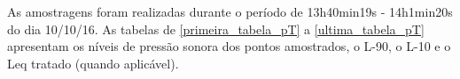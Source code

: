 
\begin{SingleSpace}
As amostragens foram realizadas durante o período de 13h40min19s - 14h1min20s do dia 10/10/16. As tabelas de \ref{primeira_tabela_pT} a \ref{ultima_tabela_pT} apresentam os níveis de pressão sonora dos pontos amostrados, o L-90, o L-10 e o Leq tratado (quando aplicável). \\\end{SingleSpace} 
